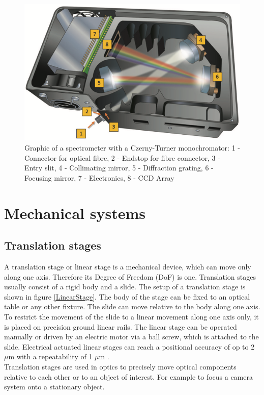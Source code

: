 \begin{figure}
\begin{center}
\includegraphics[width=12cm]{Pictures/CzernyTurnerSpect}
\caption[Graphic of a spectrometer with a Czerny-Turner monochromator]{Graphic of a spectrometer with a Czerny-Turner monochromator\cite{LoefflerLang2020}: 1 - Connector for optical fibre, 2 - Endstop for fibre connector, 3 - Entry slit, 4 - Collimating mirror, 5 - Diffraction grating, 6 - Focusing mirror, 7 - Electronics, 8 - CCD Array}
\label{CzernyTurnerSpec}
\end{center}
\end{figure}






\section{Mechanical systems}

\subsection{Translation stages}
A translation stage or linear stage is a mechanical device, which can move only along one axis. Therefore its Degree of Freedom (DoF) is one. Translation stages usually consist of a rigid body and a slide. The setup of a translation stage is shown in figure \ref{LinearStage}. The body of the stage can be fixed to an optical table or any other fixture. The slide can move relative to the body along one axis. To restrict the movement of the slide to a linear movement along one axis only, it is placed on precision ground linear rails. The linear stage can be operated manually or driven by an electric motor via a ball screw, which is attached to the slide. Electrical actuated linear stages can reach a positional accuracy of op to 2 $\mu$m with a repeatability of 1 $\mu$m \cite{Thorlabs2018LinStage}.\\
Translation stages are used in optics to precisely move optical components relative to each other or to an object of interest. For example to focus a camera system onto a stationary object.\cite{LoefflerLang2020}

